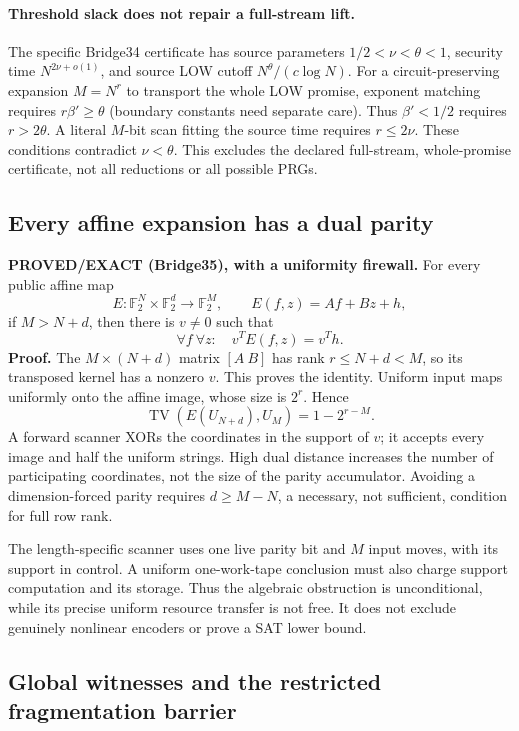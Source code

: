 \documentclass[11pt]{article}
\begin{document}
\paragraph{Threshold slack does not repair a full-stream lift.}
The specific Bridge34 certificate has source parameters
$1/2<\nu<\theta<1$, security time $N^{2\nu+o(1)}$, and source LOW cutoff
$N^\theta/(c\log N)$. For a circuit-preserving expansion $M=N^r$ to
transport the whole LOW promise, exponent matching requires
$r\beta'\geq\theta$ (boundary constants need separate care). Thus
$\beta'<1/2$ requires $r>2\theta$. A literal $M$-bit scan fitting the
source time requires $r\leq2\nu$. These conditions contradict
$\nu<\theta$. This excludes the declared full-stream, whole-promise
certificate, not all reductions or all possible PRGs.

\subsection{Every affine expansion has a dual parity}

\textbf{PROVED/EXACT (Bridge35), with a uniformity firewall.}
For every public affine map
\[
 E:\mathbb F_2^N\times\mathbb F_2^d\to\mathbb F_2^M,
 \qquad E(f,z)=Af+Bz+h,
\]
if $M>N+d$, then there is $v\neq0$ such that
\[
 \forall f\ \forall z:\quad v^TE(f,z)=v^Th.
\]
\textbf{Proof.} The $M\times(N+d)$ matrix $[A\ B]$ has rank
$r\leq N+d<M$, so its transposed kernel has a nonzero $v$. This proves
the identity. Uniform input maps uniformly onto the affine image, whose
size is $2^r$. Hence
\[
 \operatorname{TV}(E(U_{N+d}),U_M)=1-2^{r-M}.
\]
A forward scanner XORs the coordinates in the support of $v$; it accepts
every image and half the uniform strings. High dual distance increases
the number of participating coordinates, not the size of the parity
accumulator. Avoiding a dimension-forced parity requires $d\geq M-N$,
a necessary, not sufficient, condition for full row rank.

The length-specific scanner uses one live parity bit and $M$ input moves,
with its support in control. A uniform one-work-tape conclusion must also
charge support computation and its storage. Thus the algebraic obstruction
is unconditional, while its precise uniform resource transfer is not free.
It does not exclude genuinely nonlinear encoders or prove a SAT lower bound.

\subsection{Global witnesses and the restricted fragmentation barrier}
\end{document}
